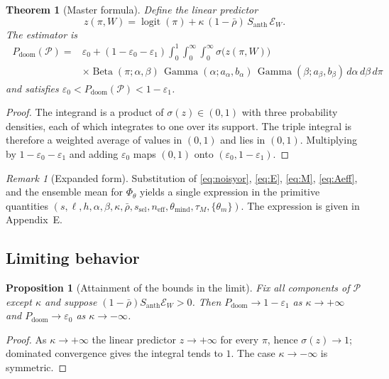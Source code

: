 \documentclass[11pt]{article}
\newtheorem{proposition}{Proposition}[section]
\newtheorem{theorem}{Theorem}[section]
\theoremstyle{remark}
\newtheorem{remark}{Remark}[section]
\DeclareMathOperator{\logit}{logit}
\DeclareMathOperator{\Beta}{Beta}
\DeclareMathOperator{\Gam}{Gamma}
\newcommand{\PD}{P_{\mathrm{doom}}}
\newcommand{\Santh}{S_{\mathrm{anth}}}
\newcommand{\rhobar}{\bar{\rho}}
\newcommand{\eone}{\varepsilon_1}
\newcommand{\ezero}{\varepsilon_0}
\begin{document}
\begin{theorem}[Master formula]\label{thm:master}
Define the linear predictor
\begin{equation}
z(\pi,W)=\logit(\pi)+\kappa\,(1-\rhobar)\,\Santh\,\mathcal{E}_W.
\end{equation}
The estimator is
\begin{equation}\label{eq:master}
\boxed{\;\begin{aligned}
\PD(\mathcal{P})={}&\ezero+(1-\ezero-\eone)\int_0^1\!\!\int_0^\infty\!\!\int_0^\infty
\sigma\bigl(z(\pi,W)\bigr)\\
&\times\Beta(\pi;\alpha,\beta)\,\Gam(\alpha;a_\alpha,b_\alpha)\,\Gam(\beta;a_\beta,b_\beta)\,d\alpha\,d\beta\,d\pi
\end{aligned}\;}
\end{equation}
and satisfies $\ezero<\PD(\mathcal{P})<1-\eone$.
\end{theorem}
\begin{proof}
The integrand is a product of $\sigma(z)\in(0,1)$ with three probability densities, each of which integrates to one over its support. The triple integral is therefore a weighted average of values in $(0,1)$ and lies in $(0,1)$. Multiplying by $1-\ezero-\eone$ and adding $\ezero$ maps $(0,1)$ onto $(\ezero,1-\eone)$. \qedhere
\end{proof}

\begin{remark}[Expanded form]
Substitution of \eqref{eq:noisyor}, \eqref{eq:E}, \eqref{eq:M}, \eqref{eq:Aeff}, and the ensemble mean for $\Phi_\theta$ yields a single expression in the primitive quantities $(s,\ell,h,\alpha,\beta,\kappa,\rhobar,s_{\mathrm{sel}},n_{\mathrm{eff}},\theta_{\mathrm{mind}},\tau_M,\{\theta_m\})$. The expression is given in Appendix~E.
\end{remark}

\subsection{Limiting behavior}

\begin{proposition}[Attainment of the bounds in the limit]\label{prop:limits}
Fix all components of $\mathcal{P}$ except $\kappa$ and suppose $(1-\rhobar)\Santh\mathcal{E}_W>0$. Then $\PD\to 1-\eone$ as $\kappa\to+\infty$ and $\PD\to\ezero$ as $\kappa\to-\infty$.
\end{proposition}
\begin{proof}
As $\kappa\to+\infty$ the linear predictor $z\to+\infty$ for every $\pi$, hence $\sigma(z)\to 1$; dominated convergence gives the integral tends to $1$. The case $\kappa\to-\infty$ is symmetric. \qedhere
\end{proof}
\end{document}
